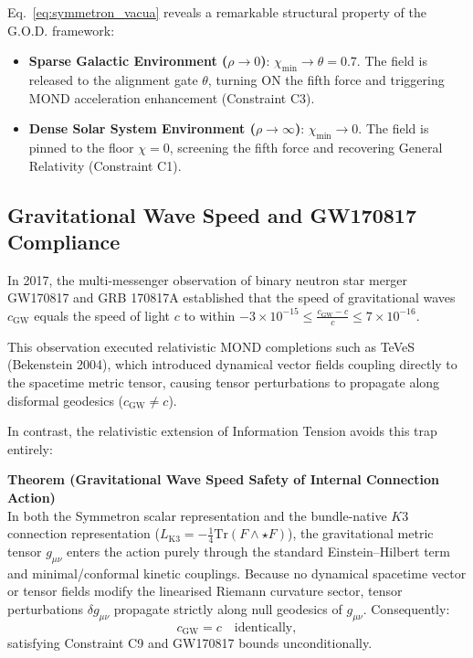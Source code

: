 \documentclass[11pt,a4paper]{article}
\theoremstyle{definition}
\begin{document}
Eq.~\eqref{eq:symmetron_vacua} reveals a remarkable structural property of the G.O.D. framework:
\begin{itemize}
\item \textbf{Sparse Galactic Environment ($\rho \to 0$)}: $\chi_{\text{min}} \to \theta = 0.7$. The field is released to the alignment gate $\theta$, turning ON the fifth force and triggering MOND acceleration enhancement (Constraint C3).
\item \textbf{Dense Solar System Environment ($\rho \to \infty$)}: $\chi_{\text{min}} \to 0$. The field is pinned to the floor $\chi=0$, screening the fifth force and recovering General Relativity (Constraint C1).
\end{itemize}

\subsection{Gravitational Wave Speed and GW170817 Compliance}
In 2017, the multi-messenger observation of binary neutron star merger GW170817 and GRB 170817A established that the speed of gravitational waves $c_{\text{GW}}$ equals the speed of light $c$ to within $-3 \times 10^{-15} \le \frac{c_{\text{GW}} - c}{c} \le 7 \times 10^{-16}$.

This observation executed relativistic MOND completions such as TeVeS (Bekenstein 2004), which introduced dynamical vector fields coupling directly to the spacetime metric tensor, causing tensor perturbations to propagate along disformal geodesics ($c_{\text{GW}} \neq c$).

In contrast, the relativistic extension of Information Tension avoids this trap entirely:
\begin{mdframed}[style=codex]
{\color{gold}\bfseries Theorem (Gravitational Wave Speed Safety of Internal Connection Action)}\\[0.1cm]
In both the Symmetron scalar representation and the bundle-native $K3$ connection representation ($L_{\text{K3}} = -\frac{1}{4}\text{Tr}(F \wedge \star F)$), the gravitational metric tensor $g_{\mu\nu}$ enters the action purely through the standard Einstein--Hilbert term and minimal/conformal kinetic couplings. Because no dynamical spacetime vector or tensor fields modify the linearised Riemann curvature sector, tensor perturbations $\delta g_{\mu\nu}$ propagate strictly along null geodesics of $g_{\mu\nu}$. Consequently:
\begin{equation}
c_{\text{GW}} = c \quad \text{identically},
\end{equation}
satisfying Constraint C9 and GW170817 bounds unconditionally.
\end{mdframed}
\end{document}
